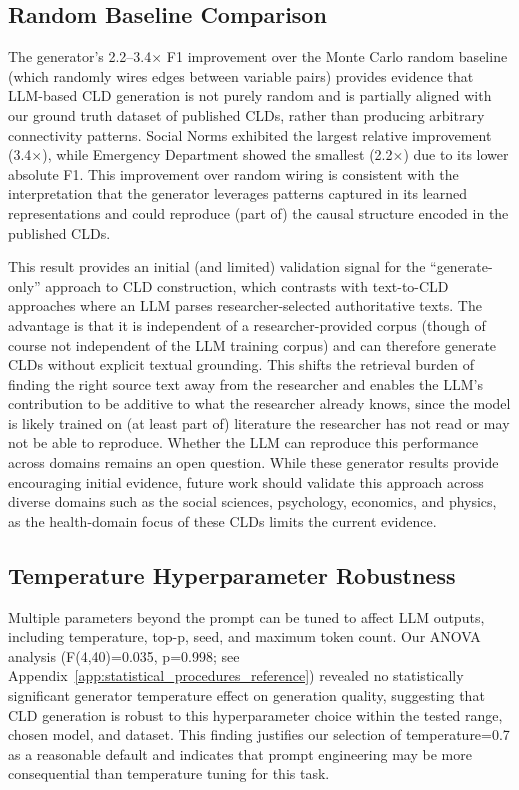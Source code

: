 \subsection{Random Baseline Comparison}

The generator's 2.2--3.4$\times$ F1 improvement over the Monte Carlo random baseline (which randomly wires edges between variable pairs) provides evidence that LLM-based CLD generation is not purely random and is partially aligned with our ground truth dataset of published CLDs, rather than producing arbitrary connectivity patterns. Social Norms exhibited the largest relative improvement (3.4$\times$), while Emergency Department showed the smallest (2.2$\times$) due to its lower absolute F1. This improvement over random wiring is consistent with the interpretation that the generator leverages patterns captured in its learned representations and could reproduce (part of) the causal structure encoded in the published CLDs.

This result provides an initial (and limited) validation signal for the ``generate-only'' approach to CLD construction, which contrasts with text-to-CLD approaches where an LLM parses researcher-selected authoritative texts. The advantage is that it is independent of a researcher-provided corpus (though of course not independent of the LLM training corpus) and can therefore generate CLDs without explicit textual grounding. This shifts the retrieval burden of finding the right source text away from the researcher and enables the LLM's contribution to be additive to what the researcher already knows, since the model is likely trained on (at least part of) literature the researcher has not read or may not be able to reproduce. Whether the LLM can reproduce this performance across domains remains an open question. While these generator results provide encouraging initial evidence, future work should validate this approach across diverse domains such as the social sciences, psychology, economics, and physics, as the health-domain focus of these CLDs limits the current evidence.

\subsection{Temperature Hyperparameter Robustness}

Multiple parameters beyond the prompt can be tuned to affect LLM outputs, including temperature, top-p, seed, and maximum token count. Our ANOVA analysis (F(4,40)=0.035, p=0.998; see Appendix~\ref{app:statistical_procedures_reference}) revealed no statistically significant generator temperature effect on generation quality, suggesting that CLD generation is robust to this hyperparameter choice within the tested range, chosen model, and dataset. This finding justifies our selection of temperature=0.7 as a reasonable default and indicates that prompt engineering may be more consequential than temperature tuning for this task.

